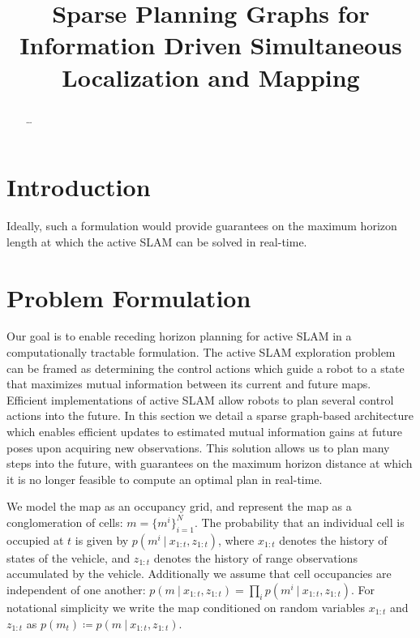 \documentclass[conference]{IEEEtran}
\begin{document}
\title{Sparse Planning Graphs for Information Driven Simultaneous Localization and Mapping}
\author{
}

\maketitle

\begin{abstract}
\boldmath
\dots
\end{abstract}

\IEEEpeerreviewmaketitle

\section{Introduction}

Ideally, such a formulation would provide guarantees on the maximum horizon length at which the active SLAM can be solved in real-time.

\section{Problem Formulation}

Our goal is to enable receding horizon planning for active SLAM in a computationally tractable formulation. The active SLAM exploration problem can be framed as determining the control actions which guide a robot to a state that maximizes mutual information between its current and future maps. Efficient implementations of active SLAM allow robots to plan several control actions into the future. In this section we detail a sparse graph-based architecture which enables efficient updates to estimated mutual information gains at future poses upon acquiring new observations. This solution allows us to plan many steps into the future, with guarantees on the maximum horizon distance at which it is no longer feasible to compute an optimal plan in real-time.

We model the map as an occupancy grid, and represent the map as a conglomeration of cells: $m = \{m^{i}\}_{i=1}^{N}$. The probability that an individual cell is occupied at $t$ is given by $p\left(m^{i} \ \vert \ x_{1:t}, z_{1:t}\right)$, where $x_{1:t}$ denotes the history of states of the vehicle, and $z_{1:t}$ denotes the history of range observations accumulated by the vehicle. Additionally we assume that cell occupancies  are independent of one another: $p\left(m \ \vert \ x_{1:t}, z_{1:t}\right) = \prod_{i} p\left(m^{i} \ \vert \ x_{1:t}, z_{1:t}\right)$. For notational simplicity we write the map conditioned on random variables $x_{1:t}$ and $z_{1:t}$ as $p\left(m_{t}\right) \coloneqq p\left(m \ \vert \ x_{1:t}, z_{1:t}\right)$.
\end{document}
